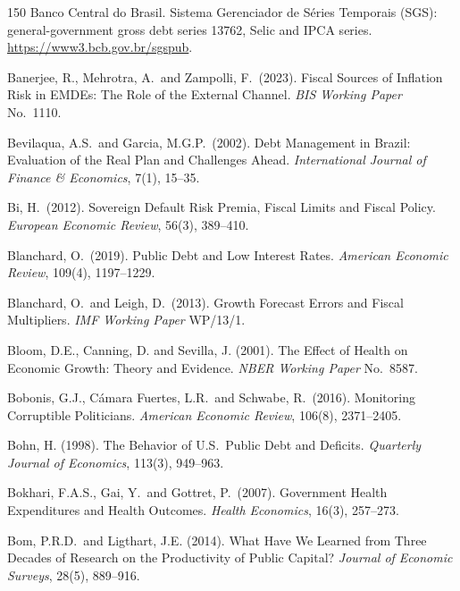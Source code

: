 \documentclass[11pt,a4paper]{article}
\begin{document}
\begin{thebibliography}{150}
 Banco Central do Brasil. Sistema Gerenciador de S\'eries Temporais (SGS): general-government gross debt series 13762, Selic and IPCA series. \url{https://www3.bcb.gov.br/sgspub}.

 Banerjee, R., Mehrotra, A.\ and Zampolli, F.\ (2023). Fiscal Sources of Inflation Risk in EMDEs: The Role of the External Channel. \textit{BIS Working Paper} No.\ 1110.

 Bevilaqua, A.S.\ and Garcia, M.G.P.\ (2002). Debt Management in Brazil: Evaluation of the Real Plan and Challenges Ahead. \textit{International Journal of Finance \& Economics}, 7(1), 15--35.

 Bi, H.\ (2012). Sovereign Default Risk Premia, Fiscal Limits and Fiscal Policy. \textit{European Economic Review}, 56(3), 389--410.

 Blanchard, O.\ (2019). Public Debt and Low Interest Rates. \textit{American Economic Review}, 109(4), 1197--1229.

 Blanchard, O.\ and Leigh, D.\ (2013). Growth Forecast Errors and Fiscal Multipliers. \textit{IMF Working Paper} WP/13/1.

 Bloom, D.E., Canning, D. and Sevilla, J. (2001). The Effect of Health on Economic Growth: Theory and Evidence. \textit{NBER Working Paper} No.\ 8587.

 Bobonis, G.J., C\'amara Fuertes, L.R.\ and Schwabe, R.\ (2016). Monitoring Corruptible Politicians. \textit{American Economic Review}, 106(8), 2371--2405.

 Bohn, H. (1998). The Behavior of U.S.\ Public Debt and Deficits. \textit{Quarterly Journal of Economics}, 113(3), 949--963.

 Bokhari, F.A.S., Gai, Y.\ and Gottret, P.\ (2007). Government Health Expenditures and Health Outcomes. \textit{Health Economics}, 16(3), 257--273.

 Bom, P.R.D.\ and Ligthart, J.E. (2014). What Have We Learned from Three Decades of Research on the Productivity of Public Capital? \textit{Journal of Economic Surveys}, 28(5), 889--916.


\end{thebibliography}
\end{document}
